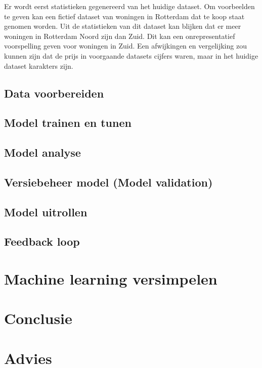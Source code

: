 Er wordt eerst statistieken gegenereerd van het huidige dataset. Om voorbeelden te geven kan een fictief dataset van woningen in Rotterdam dat te koop staat genomen worden. Uit de statistieken van dit dataset kan blijken dat er meer woningen in Rotterdam Noord zijn dan Zuid. Dit kan een onrepresentatief voorspelling geven voor woningen in Zuid. Een afwijkingen en vergelijking zou kunnen zijn dat de prijs in voorgaande datasets cijfers waren, maar in het huidige dataset karakters zijn.

\subsection{Data voorbereiden}\label{subsec:data-voorbereiden}


\subsection{Model trainen en tunen}\label{subsec:model-trainen-en-tunen}


\subsection{Model analyse}\label{subsec:model-analyse}


\subsection{Versiebeheer model (Model validation)}\label{subsec:versiebeheer-model}


\subsection{Model uitrollen}\label{subsec:model-uitrollen}


\subsection{Feedback loop}\label{subsec:feebdack-loop}


\section{Machine learning versimpelen}\label{sec:machine-learning-versimpelen}


\section{Conclusie}\label{conclusie}


\section{Advies}\label{advies}